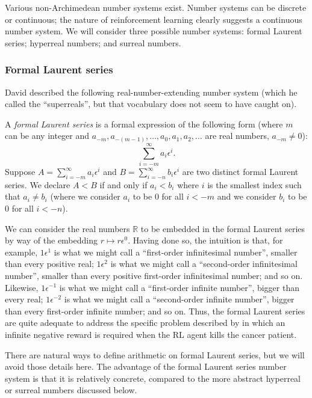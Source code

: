 \documentclass[twoside,11pt]{article}
\begin{document}
Various non-Archimedean number systems exist. Number systems can be
discrete or continuous; the nature of reinforcement learning clearly
suggests a continuous number system. We will consider three possible
number systems: formal Laurent series; hyperreal numbers; and
surreal numbers.

\subsubsection{Formal Laurent series}

David \cite{tall1980looking} described the following
real-number-extending number system (which he called the ``superreals'', but
that vocabulary does not seem to have caught on).

\begin{definition}
A \emph{formal Laurent series} is a formal expression of the following form
(where $m$ can be any integer and $a_{-m},a_{-(m-1)},\ldots,a_0,a_1,a_2,\ldots$
are real numbers, $a_{-m}\not=0$):
\[
\sum_{i=-m}^\infty a_i \epsilon^i.
\]
Suppose $A=\sum_{i=-m}^\infty a_i\epsilon^i$
and $B=\sum_{i=-n}^\infty b_i\epsilon^i$ are two distinct formal Laurent series.
We declare $A<B$ if and only if $a_i<b_i$ where $i$ is the smallest
index such that $a_i\not=b_i$ (where we consider $a_i$ to be $0$ for all
$i<-m$ and we consider $b_i$ to be $0$ for all $i<-n$).
\end{definition}

We can consider the real numbers $\mathbb R$ to be embedded in the formal Laurent
series by way of the embedding $r\mapsto r\epsilon^0$. Having done so, the intuition is that,
for example, $1\epsilon^1$ is what we might call a ``first-order
infinitesimal number'', smaller
than every positive real;
$1\epsilon^2$ is what we might call a ``second-order infinitesimal number'',
smaller than every
positive first-order infinitesimal number; and so on. Likewise,
$1\epsilon^{-1}$ is what we might call a ``first-order infinite number'', bigger than
every real; $1\epsilon^{-2}$ is what we might call a ``second-order infinite number'', bigger
than every first-order infinite number; and so on. Thus, the formal Laurent series are
quite adequate to address the specific problem described by
\cite{wirth2017survey} in which an infinite negative reward is required when the
RL agent kills the cancer patient.

There are natural ways to define arithmetic on formal Laurent series, but we will
avoid those details here.
The advantage of the formal Laurent series number system is that it is
relatively concrete, compared to the more abstract hyperreal or surreal numbers
discussed below.
\end{document}
